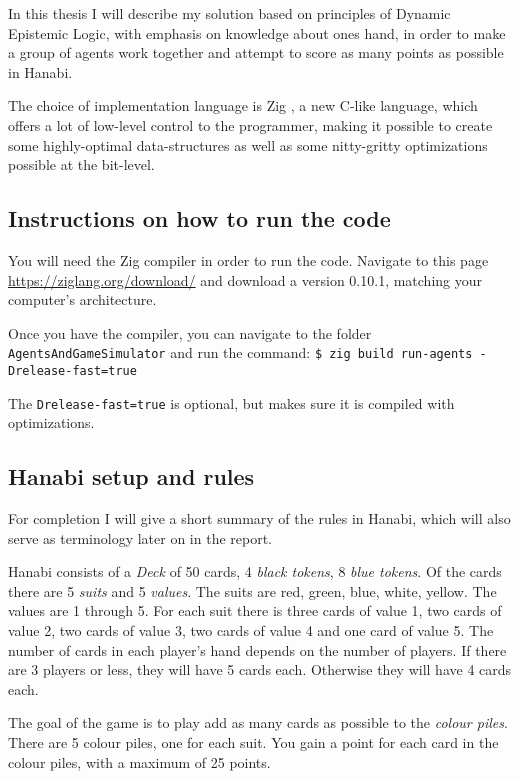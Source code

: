 In this thesis I will describe my solution based on principles of Dynamic Epistemic Logic, with emphasis on knowledge about ones hand, in order to make a group of agents work together and attempt to score as many points as possible in Hanabi. 

The choice of implementation language is Zig \cite{Ziglang}, a new C-like language, which offers a lot of low-level control to the programmer, making it possible to create some highly-optimal data-structures as well as some nitty-gritty optimizations possible at the bit-level.



\subsection{Instructions on how to run the code}
You will need the Zig compiler in order to run the code. Navigate to this page \url{https://ziglang.org/download/} and download a version 0.10.1, matching your computer's architecture.

Once you have the compiler, you can navigate to the folder {\tt AgentsAndGameSimulator} and run the command: {\tt \$ zig build run-agents -Drelease-fast=true}

The {\tt Drelease-fast=true} is optional, but makes sure it is compiled with optimizations.



\subsection{Hanabi setup and rules}
For completion I will give a short summary of the rules in Hanabi, which will also serve as terminology later on in the report.

Hanabi consists of a \emph{Deck} of 50 cards, 4 \emph{black tokens}, 8 \emph{blue tokens}.  
Of the cards there are 5 \emph{suits} and 5 \emph{values}. 
The suits are red, green, blue, white, yellow. 
The values are 1 through 5. 
For each suit there is three cards of value 1, two cards of value 2, two cards of value 3, two cards of value 4 and one card of value 5.
The number of cards in each player's hand depends on the number of players. If there are 3 players or less, they will have 5 cards each. 
Otherwise they will have 4 cards each.

The goal of the game is to play add as many cards as possible to the \emph{colour piles}. 
There are 5 colour piles, one for each suit. 
You gain a point for each card in the colour piles, with a maximum of 25 points.

